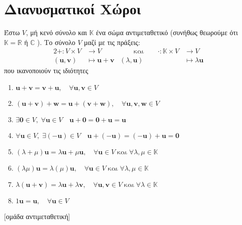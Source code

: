 



\let\oldhat\hat
\renewcommand{\vec}[1]{\mathbf{#1}}
\renewcommand{\hat}[1]{\oldhat{\mathbf{#1}}} 




\chapter{Διανυσματικοί Χώροι}


\begin{dfn}
\item {}
    Έστω $V$, μή κενό σύνολο και $\mathbb{K}$ ένα σώμα αντιμεταθετικό 
    (συνήθως θεωρούμε ότι $ \mathbb{K} = \mathbb{R} $ ή $\mathbb{C}$ ). 
    Το σύνολο $V$ μαζί με τις πράξεις:
    \begin{alignat*}{2}
        + \colon V \times V &\to V & \qquad \text{και} \qquad \cdot \colon \mathbb{K} 
        \times V &\to V \\ ( \vec{u}, \vec{v} ) &\mapsto \vec{u} + \vec{v} 
                 & ( \lambda, \vec{u} ) &\mapsto \lambda \vec{u} 
    \end{alignat*}
    \vspace{\baselineskip}
    που ικανοποιούν τις ιδιότητες 

    \begin{minipage}{0.5\textwidth}
        \begin{enumerate}
            \item $ \vec{u} + \vec{v} = \vec{v} + \vec{u}, \quad \forall \mathbf{u}, 
                \mathbf{v} \in V $ 
                \hfill{}
            \item $ ( \vec{u} + \vec{v} ) + \vec{w} = \vec{u} + ( \vec{v} + \vec{w}),
                \quad \forall \mathbf{u}, \mathbf{v}, \mathbf{w} \in V $ 
            \item $ \exists \vec{0} \in V, \; \forall \mathbf{u} \in V \quad 
                \vec{u} + \vec{0} = \vec{0} + \vec{u} = \vec{u} $ 
            \item $ \forall \mathbf{u} \in V, \; \exists (- \mathbf{u}) \in V \quad  
                \vec{u} + ( - \vec{u} ) = ( - \vec{u} ) + \vec{u} = \vec{0} $ 
                \hfill{}
            \item $ ( \lambda + \mu ) \vec{u} = \lambda \vec{u} + \mu \vec{u}, \quad 
                \forall \mathbf{u} \in V \; \text{και} \; \forall \lambda, \mu \in 
                \mathbb{K} $ 
            \item $ ( \lambda \mu ) \vec{u} = \lambda ( \mu) \vec{u}, \quad  
                \forall \mathbf{u} \in V \; \text{και} \; \forall \lambda, \mu \in 
                \mathbb{K} $ 
            \item $ \lambda ( \vec{u} + \vec{v} ) = \lambda \vec{u} + \lambda \vec{v}, 
                \quad \forall \mathbf{u}, \mathbf{v} \in V \; \text{και} \; \forall  
                \lambda \in \mathbb{K} $ 
            \item $ 1 \vec{u} = \vec{u}, \quad \forall \mathbf{u} \in V $ 
        \end{enumerate}
        [ομάδα αντιμεταθετική]
    \end{minipage}


\end{dfn}
